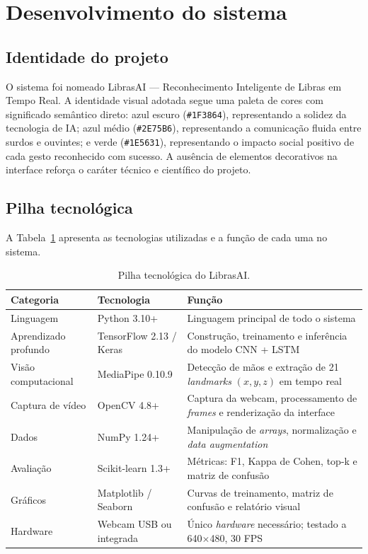 \section{Desenvolvimento do sistema}

\subsection{Identidade do projeto}

O sistema foi nomeado LibrasAI — Reconhecimento Inteligente de Libras em Tempo
Real. A identidade visual adotada segue uma paleta de cores com significado
semântico direto: azul escuro (\texttt{\#1F3864}), representando a solidez da
tecnologia de IA; azul médio (\texttt{\#2E75B6}), representando a comunicação
fluida entre surdos e ouvintes; e verde (\texttt{\#1E5631}), representando o
impacto social positivo de cada gesto reconhecido com sucesso. A ausência de
elementos decorativos na interface reforça o caráter técnico e científico do
projeto.

\subsection{Pilha tecnológica}

A Tabela~\ref{tab:pilha} apresenta as tecnologias utilizadas e a função de cada
uma no sistema.

\begin{table}[htbp]
\centering
\caption{Pilha tecnológica do LibrasAI.}
\label{tab:pilha}
\small
\begin{tabular}{@{}p{3cm} p{3.6cm} p{6cm}@{}}
\toprule
\textbf{Categoria} & \textbf{Tecnologia} & \textbf{Função} \\
\midrule
Linguagem & Python 3.10+ & Linguagem principal de todo o sistema \\
Aprendizado profundo & TensorFlow 2.13 / Keras & Construção, treinamento e inferência do modelo CNN + LSTM \\
Visão computacional & MediaPipe 0.10.9 & Detecção de mãos e extração de 21 \textit{landmarks} $(x, y, z)$ em tempo real \\
Captura de vídeo & OpenCV 4.8+ & Captura da webcam, processamento de \textit{frames} e renderização da interface \\
Dados & NumPy 1.24+ & Manipulação de \textit{arrays}, normalização e \textit{data augmentation} \\
Avaliação & Scikit-learn 1.3+ & Métricas: F1, Kappa de Cohen, top-k e matriz de confusão \\
Gráficos & Matplotlib / Seaborn & Curvas de treinamento, matriz de confusão e relatório visual \\
Hardware & Webcam USB ou integrada & Único \textit{hardware} necessário; testado a 640$\times$480, 30 FPS \\
\bottomrule
\end{tabular}
\end{table}


